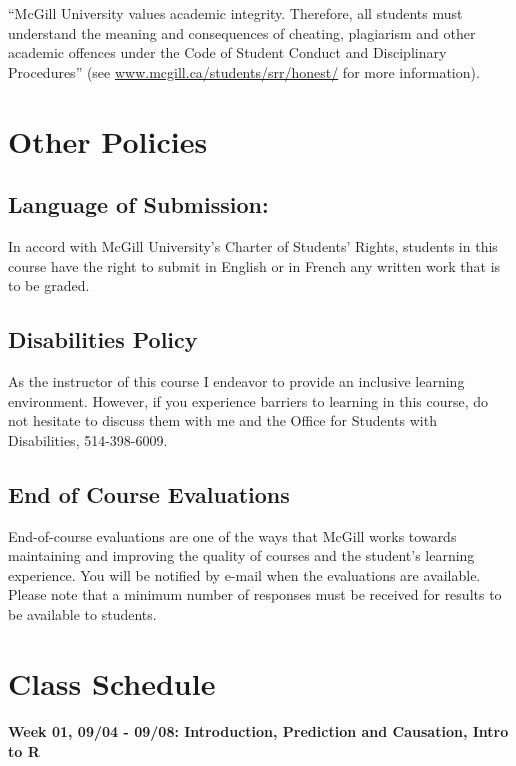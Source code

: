 \documentclass[11pt,]{article}
\begin{document}
``McGill University values academic integrity. Therefore, all students
must understand the meaning and consequences of cheating, plagiarism and
other academic offences under the Code of Student Conduct and
Disciplinary Procedures'' (see \url{www.mcgill.ca/students/srr/honest/}
for more information).

\section{Other Policies}\label{other-policies}

\subsection{Language of Submission:}\label{language-of-submission}

In accord with McGill University's Charter of Students' Rights, students
in this course have the right to submit in English or in French any
written work that is to be graded.

\subsection{Disabilities Policy}\label{disabilities-policy}

As the instructor of this course I endeavor to provide an inclusive
learning environment. However, if you experience barriers to learning in
this course, do not hesitate to discuss them with me and the Office for
Students with Disabilities, 514-398-6009.

\subsection{End of Course Evaluations}\label{end-of-course-evaluations}

End-of-course evaluations are one of the ways that McGill works towards
maintaining and improving the quality of courses and the student's
learning experience. You will be notified by e-mail when the evaluations
are available. Please note that a minimum number of responses must be
received for results to be available to students. \newpage

\section{Class Schedule}\label{class-schedule}

\paragraph{Week 01, 09/04 - 09/08: Introduction, Prediction and
Causation, Intro to
R}\label{week-01-0904---0908-introduction-prediction-and-causation-intro-to-r}
\end{document}
